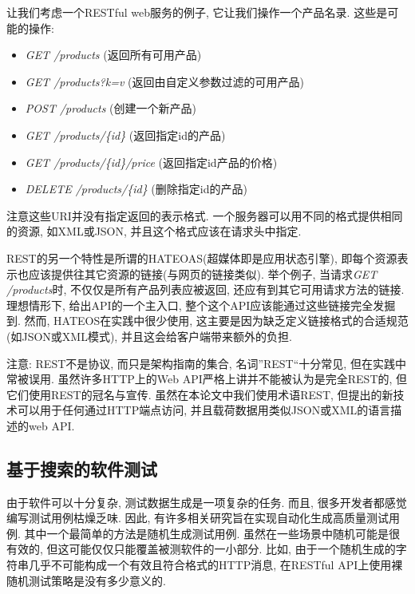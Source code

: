         让我们考虑一个RESTful web服务的例子, 它让我们操作一个产品名录. 这些是可能的操作: 
        \begin{itemize}
          \item \textit{GET /products} (返回所有可用产品)
            \item \textit{GET /products?k=v} (返回由自定义参数过滤的可用产品)
            \item \textit{POST /products} (创建一个新产品)
            \item \textit{GET /products/\{id\}} (返回指定id的产品)
            \item \textit{GET /products/\{id\}/price} (返回指定id产品的价格)
            \item \textit{DELETE /products/\{id\}} (删除指定id的产品)
        \end{itemize}
      注意这些URI并没有指定返回的表示格式. 一个服务器可以用不同的格式提供相同的资源, 如XML或JSON, 并且这个格式应该在请求头中指定. 
        
        REST的另一个特性是所谓的HATEOAS(超媒体即是应用状态引擎), 即每个资源表示也应该提供往其它资源的链接(与网页的链接类似). 举个例子, 当请求\textit{GET /products}时, 不仅仅是所有产品列表应被返回, 还应有到其它可用请求方法的链接. 理想情形下, 给出API的一个主入口, 整个这个API应该能通过这些链接完全发掘到. 然而, HATEOS在实践中很少使用, 这主要是因为缺乏定义链接格式的合适规范(如JSON或XML模式), 并且这会给客户端带来额外的负担. 
        
        注意: REST不是协议, 而只是架构指南的集合, 名词”REST“十分常见, 但在实践中常被误用. 虽然许多HTTP上的Web API严格上讲并不能被认为是完全REST的, 但它们使用REST的冠名与宣传. 虽然在本论文中我们使用术语REST, 但提出的新技术可以用于任何通过HTTP端点访问, 并且载荷数据用类似JSON或XML的语言描述的web API. 
    
    \subsection{基于搜索的软件测试}
    由于软件可以十分复杂, 测试数据生成是一项复杂的任务. 而且, 很多开发者都感觉编写测试用例枯燥乏味. 因此, 有许多相关研究旨在实现自动化生成高质量测试用例. 其中一个最简单的方法是随机生成测试用例. 虽然在一些场景中随机可能是很有效的, 但这可能仅仅只能覆盖被测软件的一小部分. 比如, 由于一个随机生成的字符串几乎不可能构成一个有效且符合格式的HTTP消息, 在RESTful API上使用裸随机测试策略是没有多少意义的. 
        
